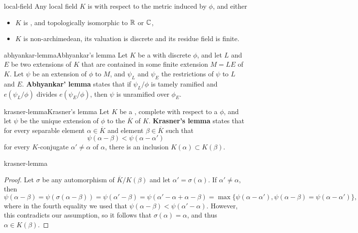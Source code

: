 \begin{example}{local-field}
    Any local field $K$ is  with respect to the metric induced by $\phi$, and either
    \begin{itemize}
        \item $K$ is , and topologically isomorphic to $\mathbb{R}$ or $\mathbb{C}$,
        \item $K$ is non-archimedean, its valuation is discrete and its residue field is finite.
    \end{itemize}
\end{example}

\begin{topic}{abhyankar-lemma}{Abhyankar's lemma}
    Let $K$ be a  with discrete  $\phi$, and let $L$ and $E$ be two extensions of $K$ that are contained in some finite extension $M = LE$ of $K$. Let $\psi$ be an extension of $\phi$ to $M$, and $\psi_L$ and $\psi_E$ the restrictions of $\psi$ to $L$ and $E$. \textbf{Abhyankar' lemma} states that if $\psi_L/\phi$ is tamely ramified and $e(\psi_L/\phi)$ divides $e(\psi_E/\phi)$, then $\psi$ is unramified over $\phi_E$.
\end{topic}

\begin{topic}{krasner-lemma}{Krasner's lemma}
    Let $K$ be a , complete with respect to a  $\phi$, and let $\psi$ be the unique extension of $\phi$ to the  $\overline{K}$ of $K$.
    \textbf{Krasner's lemma} states that for every separable element $\alpha \in \overline{K}$ and element $\beta \in \overline{K}$ such that
    \[ \psi(\alpha - \beta) < \psi(\alpha - \alpha') \]
    for every $K$-conjugate $\alpha' \ne \alpha$ of $\alpha$, there is an inclusion $K(\alpha) \subset K(\beta)$.
\end{topic}

\begin{example}{krasner-lemma}
    \begin{proof}
        Let $\sigma$ be any automorphism of $\overline{K} / K(\beta)$ and let $\alpha' = \sigma(\alpha)$. If $\alpha' \ne \alpha$, then
        \[ \psi(\alpha - \beta) = \psi(\sigma(\alpha - \beta)) = \psi(\alpha' - \beta) = \psi(\alpha' - \alpha + \alpha - \beta) = \max \{ \psi(\alpha - \alpha'), \psi(\alpha - \beta) = \psi(\alpha - \alpha') \} , \]
        where in the fourth equality we used that $\psi(\alpha - \beta) < \psi(\alpha' - \alpha)$. However, this contradicts our assumption, so it follows that $\sigma(\alpha) = \alpha$, and thus $\alpha \in K(\beta)$.
    \end{proof}
\end{example}

